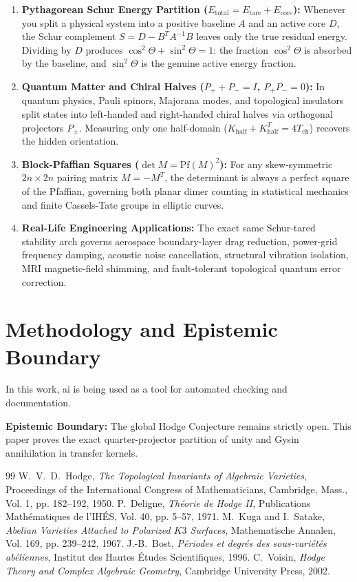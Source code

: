 \documentclass[11pt,a4paper]{article}
\theoremstyle{definition}
\begin{document}
\begin{enumerate}
  \item \textbf{Pythagorean Schur Energy Partition ($E_{\mathrm{total}} = E_{\mathrm{tare}} + E_{\mathrm{core}}$):} Whenever you split a physical system into a positive baseline $A$ and an active core $D$, the Schur complement $S = D - B^T A^{-1} B$ leaves only the true residual energy. Dividing by $D$ produces $\cos^2\Theta + \sin^2\Theta = 1$: the fraction $\cos^2\Theta$ is absorbed by the baseline, and $\sin^2\Theta$ is the genuine active energy fraction.
  \item \textbf{Quantum Matter and Chiral Halves ($P_+ + P_- = I$, $P_+ P_- = 0$):} In quantum physics, Pauli spinors, Majorana modes, and topological insulators split states into left-handed and right-handed chiral halves via orthogonal projectors $P_\pm$. Measuring only one half-domain ($K_{\mathrm{half}} + K_{\mathrm{half}}^T = 4 T_{\mathrm{ch}}$) recovers the hidden orientation.
  \item \textbf{Block-Pfaffian Squares ($\det M = \mathrm{Pf}(M)^2$):} For any skew-symmetric $2n \times 2n$ pairing matrix $M = -M^T$, the determinant is always a perfect square of the Pfaffian, governing both planar dimer counting in statistical mechanics and finite Cassels-Tate groups in elliptic curves.
  \item \textbf{Real-Life Engineering Applications:} The exact same Schur-tared stability arch governs aerospace boundary-layer drag reduction, power-grid frequency damping, acoustic noise cancellation, structural vibration isolation, MRI magnetic-field shimming, and fault-tolerant topological quantum error correction.
\end{enumerate}

\section{Methodology and Epistemic Boundary}

In this work, ai is being used as a tool for automated checking and documentation.

\textbf{Epistemic Boundary:} The global Hodge Conjecture remains strictly open. This paper proves the exact quarter-projector partition of unity and Gysin annihilation in transfer kernels.


\begin{thebibliography}{99}
 W.~V.~D.~Hodge, \emph{The Topological Invariants of Algebraic Varieties}, Proceedings of the International Congress of Mathematicians, Cambridge, Mass., Vol. 1, pp. 182--192, 1950.
 P.~Deligne, \emph{Th\'eorie de Hodge II}, Publications Math\'ematiques de l'IH\'ES, Vol. 40, pp. 5--57, 1971.
 M.~Kuga and I.~Satake, \emph{Abelian Varieties Attached to Polarized $K3$ Surfaces}, Mathematische Annalen, Vol. 169, pp. 239--242, 1967.
 J.-B.~Bost, \emph{P\'eriodes et degr\'es des sous-vari\'et\'es ab\'eliennes}, Institut des Hautes \'Etudes Scientifiques, 1996.
 C.~Voisin, \emph{Hodge Theory and Complex Algebraic Geometry}, Cambridge University Press, 2002.
\end{thebibliography}
\end{document}
